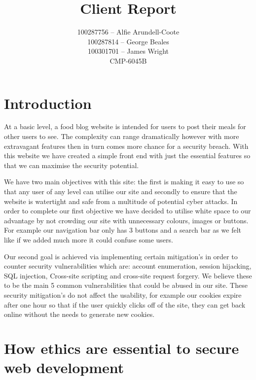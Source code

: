 \documentclass{ueacmpstyle}
\begin{document}
	\title{Client Report}    %
	\author{
		100287756 -- Alfie Arundell-Coote\\
		100287814 -- George Beales\\
		100301701 -- James Wright\\
		CMP-6045B     %
	}
	\maketitle

    \section{Introduction}\label{sec:Intro}
        At a basic level, a food blog website is intended for users to post their meals for other users to see. The complexity can range dramatically however with more extravagant features then in turn comes more chance for a security breach. With this website we have created a simple front end with just the essential features so that we can maximise the security potential.
        
        We have two main objectives with this site: the first is making it easy to use so that any user of any level can utilise our site and secondly to ensure that the website is watertight and safe from a multitude of potential cyber attacks.
        In order to complete our first objective we have decided to utilise white space to our advantage by not crowding our site with unnecessary colours, images or buttons. For example our navigation bar only has 3 buttons and a search bar as we felt like if we added much more it could confuse some users.
        
        Our second goal is achieved via implementing certain mitigation's in order to counter security vulnerabilities which are: account enumeration, session hijacking, SQL injection, Cross-site scripting and cross-site request forgery. We believe these to be the main 5 common vulnerabilities that could be abused in our site. These security mitigation's do not affect the usability, for example our cookies expire after one hour so that if the user quickly clicks off of the site, they can get back online without the needs to generate new cookies.
    
    \section{How ethics are essential to secure web development}
    
\end{document}
